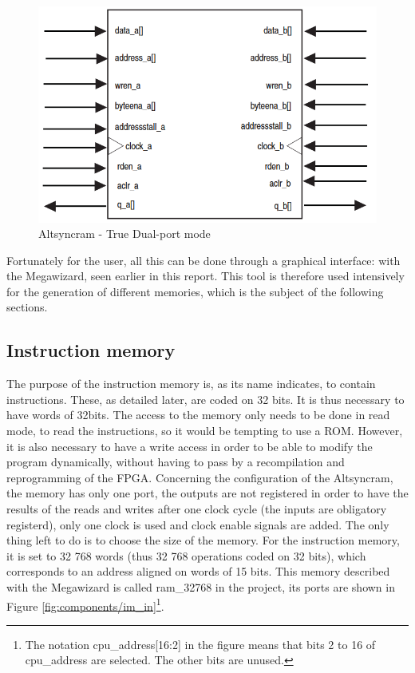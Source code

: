 \begin{figure}[H]
    \centering
    \includegraphics[scale=0.6]{Chapter3-CPU/res/altsyncram.PNG}
    \caption{Altsyncram - True Dual-port mode}
    \label{fig:memories/altsyncram}
\end{figure}

Fortunately for the user, all this can be done through a graphical interface: with the Megawizard, 
seen earlier in this report. This tool is therefore used intensively for the generation of 
different memories, which is the subject of the following sections.

\subsection{Instruction memory}

The purpose of the instruction memory is, as its name indicates, to contain instructions. These, as 
detailed later, are coded on 32 bits. It is thus necessary to have words of 32bits. The 
access to the memory only needs to be done in read mode, to read the instructions, so it would be tempting 
to use a ROM. However, it is also necessary to have a write access in order to be able to modify the 
program dynamically, without having to pass by a recompilation and reprogramming of the FPGA. 
Concerning the configuration of the Altsyncram, the 
memory has only one port, the outputs are not registered in order to have the results of the reads 
and writes after one clock cycle (the inputs are obligatory registerd), only one clock is used and 
clock enable signals are added. The only thing left to do is to choose the size of the memory. For 
the instruction memory, it is set to 32 768 words (thus 32 768 operations coded on 32 bits), which 
corresponds to an address aligned on words of 15 bits. This memory described with the Megawizard 
is called ram\_32768 in the project, its ports are shown in Figure \ref{fig:components/im_in}\footnote{
The notation cpu\_address[16:2] in the figure means that bits 2 to 16 of cpu\_address are selected. 
The other bits are unused.}.

